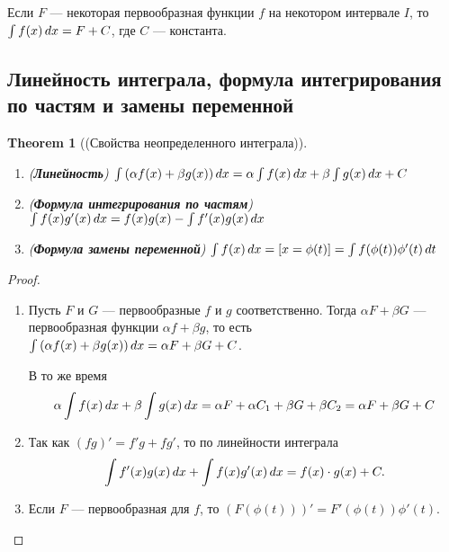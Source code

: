 \documentclass[a4paper]{article}
\theoremstyle{named}
\newtheorem*{namedtheorem}{Theorem}
\renewcommand{\int}{\intop}
\begin{document}
        Если $F$ --- некоторая первообразная функции $f$ на некотором интервале $I$, то $\int f(x) \dd x = F + C$, где $C$ --- константа.

        \subsection{Линейность интеграла, формула интегрирования по частям и замены переменной}

        \begin{namedtheorem}[(Свойства неопределенного интеграла)]~
            \begin{enumerate}
            \item (\textbf{Линейность})
                $\int \left(\alpha f(x) + \beta g(x)\right) \dd x = \alpha \int f(x) \dd x + \beta \int g(x) \dd x + C$

            \item (\textbf{Формула интегрирования по частям})
                $\int f(x)g'(x) \dd x = f(x)g(x) - \int f'(x)g(x) \dd x$

            \item (\textbf{Формула замены переменной})
                $\int f(x) \dd x = [x = \phi(t)] = \int f(\phi(t))\phi'(t) \dd t$
            \end{enumerate}
        \end{namedtheorem}

        \begin{proof}~
            \begin{enumerate}
            \item
                Пусть $F$ и $G$ --- первообразные $f$ и $g$ соответственно. Тогда $\alpha F + \beta G$ --- первообразная функции $\alpha f + \beta g$, то есть $\int \left(\alpha f(x) + \beta g(x)\right) \dd x = \alpha F + \beta G + C$.

                В то же время
                \begin{equation*}
                    \alpha \int f(x) \dd x + \beta \int g(x) \dd x = \alpha F + \alpha C_1 + \beta G + \beta C_2 = \alpha F + \beta G + C
                \end{equation*}

            \item
                Так как $(fg)' = f'g + fg'$, то по линейности интеграла
                \begin{equation*}
                    \int f'(x)g(x) \dd x + \int f(x)g'(x) \dd x = f(x) \cdot g(x) + C.
                \end{equation*}

            \item
                Если $F$ --- первообразная для $f$, то $(F(\phi(t)))' = F'(\phi(t))\phi'(t)$.
            \end{enumerate}
        \end{proof}
\end{document}
